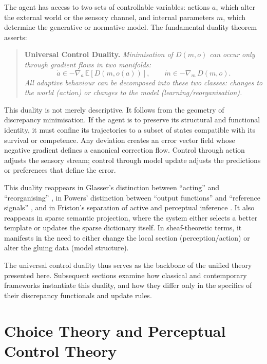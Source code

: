 \documentclass[11pt,a4paper,twoside]{article}
\begin{document}
The agent has access to two sets of controllable variables:
actions $a$, which alter the external world or the sensory channel,
and internal parameters $m$, which determine the generative or normative model.
The fundamental duality theorem asserts:

\begin{quote}
\textbf{Universal Control Duality.}
\emph{Minimisation of $D(m,o)$ can occur only through gradient flows in two manifolds:}
\[
\dot{a} \in -\nabla_a \, \mathbb{E}[D(m,o(a))], \qquad
\dot{m} \in -\nabla_m \, D(m,o).
\]
\emph{All adaptive behaviour can be decomposed into these two classes:
changes to the world (action) or changes to the model (learning/reorganisation).}
\end{quote}

This duality is not merely descriptive.
It follows from the geometry of discrepancy minimisation.
If the agent is to preserve its structural and functional identity,
it must confine its trajectories to a subset of states compatible with its survival or competence.
Any deviation creates an error vector field whose negative gradient defines a canonical correction flow.
Control through action adjusts the sensory stream; control through model update
adjusts the predictions or preferences that define the error.

This duality reappears in Glasser’s distinction between ``acting'' and ``reorganising''
\cite{glasser1998choice}, in Powers’ distinction between ``output functions'' and
``reference signals'' \cite{powers1973behavior},
and in Friston’s separation of active and perceptual inference \cite{friston2010free}.
It also reappears in sparse semantic projection,
where the system either selects a better template or updates the sparse dictionary itself.
In sheaf-theoretic terms, it manifests in the need to either change the local section
(perception/action) or alter the gluing data (model structure).

The universal control duality thus serves as the backbone of the unified theory presented here.
Subsequent sections examine how classical and contemporary frameworks instantiate this duality,
and how they differ only in the specifics of their discrepancy functionals and update rules.

\newpage


\section{Choice Theory and Perceptual Control Theory}
\end{document}
